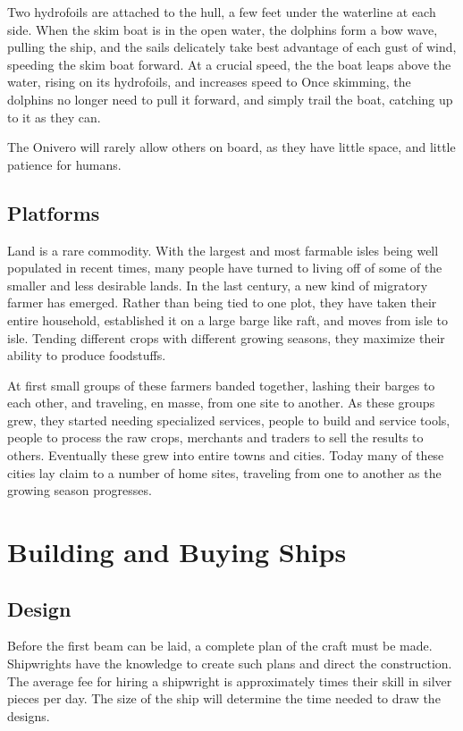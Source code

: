 \begin{multicols*}{2}
Two hydrofoils are attached to the hull, a few feet under the waterline at each side. When the skim boat is in the open water, the dolphins form a bow wave, pulling the ship,
and the sails delicately take best advantage of each gust of wind, speeding the skim boat forward. At a crucial speed, the the boat leaps above the water, rising on its hydrofoils, and increases speed to  Once skimming, the dolphins no longer need to pull it forward, and simply trail the boat, catching up to it as they can.

The Onivero will rarely allow others on board, as they have little space, and little patience for humans.
\subsection{Platforms}
Land is a rare commodity. With the largest and most farmable isles being well populated in recent times, many people have turned to living off of some of the smaller
and less desirable lands. In the last century, a new kind of migratory farmer has emerged. Rather than being tied to one plot, they have taken their entire household, established it on a large barge like raft, and moves from isle to isle. Tending different crops with different growing seasons, they maximize their ability to produce foodstuffs.

At first small groups of these farmers banded together, lashing their barges to each other, and traveling, en masse, from one site to another. As these groups grew, they
started needing specialized services, people to build and service tools, people to process the raw crops, merchants and traders to sell the results to others. Eventually these grew into entire towns and cities. Today many of these cities lay claim to a number of home sites, traveling from one to another as the growing season progresses.
\section{Building and Buying Ships}
\subsection{Design}
Before the first beam can be laid, a complete plan of the craft must be made. Shipwrights have the knowledge to create such plans and direct the construction. The average fee
for hiring a shipwright is approximately  times their  skill in silver pieces per day. The size of the ship will determine the time needed to draw the designs.


\end{multicols*}

